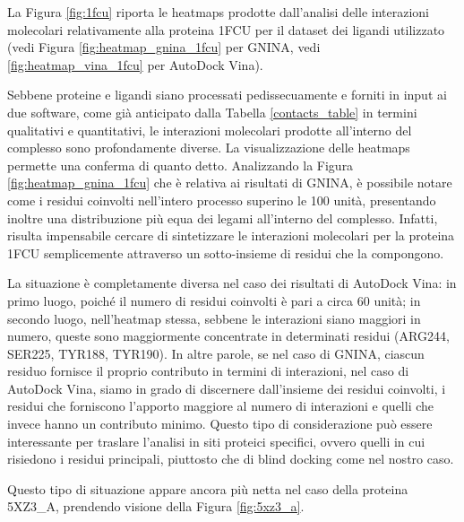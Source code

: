 La Figura \ref{fig:1fcu} riporta le heatmaps prodotte dall'analisi delle interazioni molecolari relativamente alla proteina 1FCU per il dataset dei ligandi utilizzato (vedi Figura \ref{fig:heatmap_gnina_1fcu} per GNINA, vedi \ref{fig:heatmap_vina_1fcu} per AutoDock Vina).

Sebbene proteine e ligandi siano processati pedissecuamente e forniti in input ai due software, come già anticipato dalla Tabella \ref{contacts_table} in termini qualitativi e quantitativi, le interazioni molecolari prodotte all'interno del complesso sono profondamente diverse. La visualizzazione delle heatmaps permette una conferma di quanto detto. 
Analizzando la Figura \ref{fig:heatmap_gnina_1fcu} che è relativa ai risultati di GNINA, è possibile notare come i residui coinvolti nell'intero processo superino le 100 unità, presentando inoltre una distribuzione più equa dei legami all'interno del complesso. Infatti, risulta impensabile cercare di sintetizzare le interazioni molecolari per la proteina 1FCU semplicemente attraverso un sotto-insieme di residui che la compongono.

La situazione è completamente diversa nel caso dei risultati di AutoDock Vina: in primo luogo, poiché il numero di residui coinvolti è pari a circa 60 unità; in secondo luogo, nell'heatmap stessa, sebbene le interazioni siano maggiori in numero,  queste sono maggiormente concentrate in determinati residui (ARG244, SER225, TYR188, TYR190). In altre parole, se nel caso di GNINA, ciascun residuo fornisce il proprio contributo in termini di interazioni, nel caso di AutoDock Vina, siamo in grado di discernere dall'insieme dei residui coinvolti, i residui che forniscono l'apporto maggiore al numero di interazioni e quelli che invece hanno un contributo minimo. Questo tipo di considerazione può essere interessante per traslare l'analisi in siti proteici specifici, ovvero quelli in cui risiedono i residui principali, piuttosto che di blind docking come nel nostro caso.

Questo tipo di situazione appare ancora più netta nel caso della proteina 5XZ3\_A, prendendo visione della Figura \ref{fig:5xz3_a}. 

